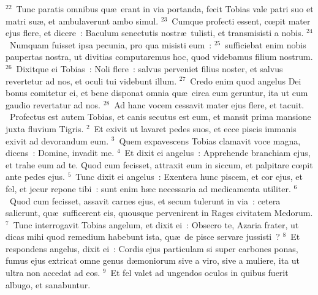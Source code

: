 ${}^{22}$~Tunc paratis omnibus qu\ae\ erant in via portanda, fecit Tobias vale patri suo et matri su\ae , et ambulaverunt ambo simul.
${}^{23}$~Cumque profecti essent, cœpit mater ejus flere, et dicere~: Baculum senectutis nostr\ae\ tulisti, et transmisisti a nobis.
${}^{24}$~Numquam fuisset ipsa pecunia, pro qua misisti eum~:
${}^{25}$~sufficiebat enim nobis paupertas nostra, ut divitias computaremus hoc, quod videbamus filium nostrum.
${}^{26}$~Dixitque ei Tobias~: Noli flere~: salvus perveniet filius noster, et salvus revertetur ad nos, et oculi tui videbunt illum.
${}^{27}$~Credo enim quod angelus Dei bonus comitetur ei, et bene disponat omnia qu\ae\ circa eum geruntur, ita ut cum gaudio revertatur ad nos.
${}^{28}$~Ad hanc vocem cessavit mater ejus flere, et tacuit.
~\lettrine[lines=10,image=true,loversize=0.05,lraise=-0.03]{P}{}rofectus est autem Tobias, et canis secutus est eum, et mansit prima mansione juxta fluvium Tigris.
${}^{2}$~Et exivit ut lavaret pedes suos, et ecce piscis immanis exivit ad devorandum eum.
${}^{3}$~Quem expavescens Tobias clamavit voce magna, dicens~: Domine, invadit me.
${}^{4}$~Et dixit ei angelus~: Apprehende branchiam ejus, et trahe eum ad te. Quod cum fecisset, attraxit eum in siccum, et palpitare cœpit ante pedes ejus.
${}^{5}$~Tunc dixit ei angelus~: Exentera hunc piscem, et cor ejus, et fel, et jecur repone tibi~: sunt enim h\ae c necessaria ad medicamenta utiliter.
${}^{6}$~Quod cum fecisset, assavit carnes ejus, et secum tulerunt in via~: cetera salierunt, qu\ae\ sufficerent eis, quousque pervenirent in Rages civitatem Medorum.
${}^{7}$~Tunc interrogavit Tobias angelum, et dixit ei~: Obsecro te, Azaria frater, ut dicas mihi quod remedium habebunt ista, qu\ae\ de pisce servare jussisti~?
${}^{8}$~Et respondens angelus, dixit ei~: Cordis ejus particulam si super carbones ponas, fumus ejus extricat omne genus d\ae moniorum sive a viro, sive a muliere, ita ut ultra non accedat ad eos.
${}^{9}$~Et fel valet ad ungendos oculos in quibus fuerit albugo, et sanabuntur.


